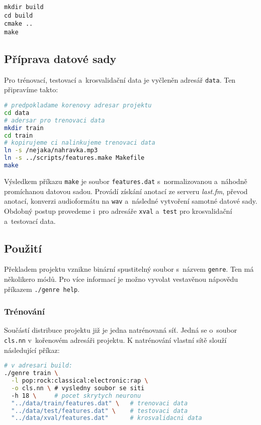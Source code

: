 \documentclass[10pt,a4paper]{article}
\begin{document}
\begin{lstlisting}
mkdir build
cd build
cmake ..
make
\end{lstlisting}

\subsection{Příprava datové sady}

Pro trénovací, testovací a~krosvalidační data je vyčleněn adresář \verb|data|.
Ten připravíme takto:

\begin{lstlisting}[language=sh]
# predpokladame korenovy adresar projektu
cd data
# adersar pro trenovaci data
mkdir train
cd train
# kopirujeme ci nalinkujeme trenovaci data
ln -s /nejaka/nahravka.mp3
ln -s ../scripts/features.make Makefile
make
\end{lstlisting}

Výsledkem příkazu \verb|make| je soubor \verb|features.dat|
s~normalizovanou a~náhodně promíchanou datovou sadou.
Provádí získání anotací ze serveru \emph{last.fm},
převod anotací, konverzi audioformátu na \verb|wav|
a~následné vytvoření samotné datové sady.
Obdobný postup provedeme i~pro adresáře \verb|xval| a~\verb|test|
pro krosvalidační a~testovací data.

\newpage
\subsection{Použití}

Překladem projektu vznikne binární spustitelný soubor
s~názvem \verb|genre|. Ten má několikero módů.
Pro více informací je možno vyvolat vestavěnou nápovědu
příkazem \verb|./genre help|.

\subsubsection{Trénování}

Součástí distribuce projektu již je jedna natrénovaná síť.
Jedná se o~soubor \verb|cls.nn| v~kořenovém adresáři projektu.
K natrénování vlastní sítě slouží následující příkaz:

\begin{lstlisting}[language=sh]
# v adresari build:
./genre train \
  -l pop:rock:classical:electronic:rap \
  -o cls.nn \ # vysledny soubor se siti
  -h 18 \     # pocet skrytych neuronu
  "../data/train/features.dat" \   # trenovaci data
  "../data/test/features.dat" \    # testovaci data
  "../data/xval/features.dat"      # krosvalidacni data
\end{lstlisting}
\end{document}
